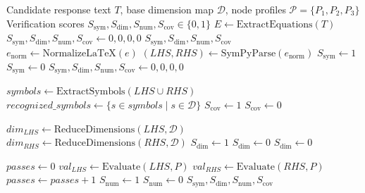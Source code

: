 \documentclass[a4paper,fleqn]{cas-sc}
\begin{document}
\begin{algorithm}
\caption{Execution steps for the deterministic neuro-symbolic equation verification algorithm, outlining symbolic parsing, coverage-aware dimensional analysis, and node-specific numerical plausibility checks.}
\label{alg:verification}
\begin{algorithmic}[1]
\Require Candidate response text $T$, base dimension map $\mathcal{D}$, node profiles $\mathcal{P} = \{P_1, P_2, P_3\}$
\Ensure Verification scores $S_{\mathrm{sym}}, S_{\mathrm{dim}}, S_{\mathrm{num}}, S_{\mathrm{cov}} \in \{0, 1\}$
\State $E \leftarrow \text{ExtractEquations}(T)$
    \State $S_{\mathrm{sym}}, S_{\mathrm{dim}}, S_{\mathrm{num}}, S_{\mathrm{cov}} \leftarrow 0, 0, 0, 0$
    \State \Return $S_{\mathrm{sym}}, S_{\mathrm{dim}}, S_{\mathrm{num}}, S_{\mathrm{cov}}$
\EndIf
{}
    \State $e_{\text{norm}} \leftarrow \text{NormalizeLaTeX}(e)$
    \State $(LHS, RHS) \leftarrow \text{SymPyParse}(e_{\text{norm}})$ 
        \State $S_{\mathrm{sym}} \leftarrow 1$
    \Else
        \State $S_{\mathrm{sym}} \leftarrow 0$
        \State \Return $S_{\mathrm{sym}}, S_{\mathrm{dim}}, S_{\mathrm{num}}, S_{\mathrm{cov}} \leftarrow 0, 0, 0, 0$
    \EndIf

    \State $symbols \leftarrow \text{ExtractSymbols}(LHS \cup RHS)$
    \State $recognized\_symbols \leftarrow \{s \in symbols \mid s \in \mathcal{D}\}$
        \State $S_{\mathrm{cov}} \leftarrow 1$
    \Else
        \State $S_{\mathrm{cov}} \leftarrow 0$
    \EndIf

        \State $dim_{LHS} \leftarrow \text{ReduceDimensions}(LHS, \mathcal{D})$
        \State $dim_{RHS} \leftarrow \text{ReduceDimensions}(RHS, \mathcal{D})$
            \State $S_{\mathrm{dim}} \leftarrow 1$
        \Else
            \State $S_{\mathrm{dim}} \leftarrow 0$
        \EndIf
    \Else
        \State $S_{\mathrm{dim}} \leftarrow 0$
    \EndIf

    \State $passes \leftarrow 0$
        \State $val_{LHS} \leftarrow \text{Evaluate}(LHS, P)$
        \State $val_{RHS} \leftarrow \text{Evaluate}(RHS, P)$ 
            \State $passes \leftarrow passes + 1$
        \EndIf
    \EndFor
        \State $S_{\mathrm{num}} \leftarrow 1$
    \Else
        \State $S_{\mathrm{num}} \leftarrow 0$
    \EndIf
\EndFor
\State \Return $S_{\mathrm{sym}}, S_{\mathrm{dim}}, S_{\mathrm{num}}, S_{\mathrm{cov}}$
\end{algorithmic}
\end{algorithm}
\end{document}
